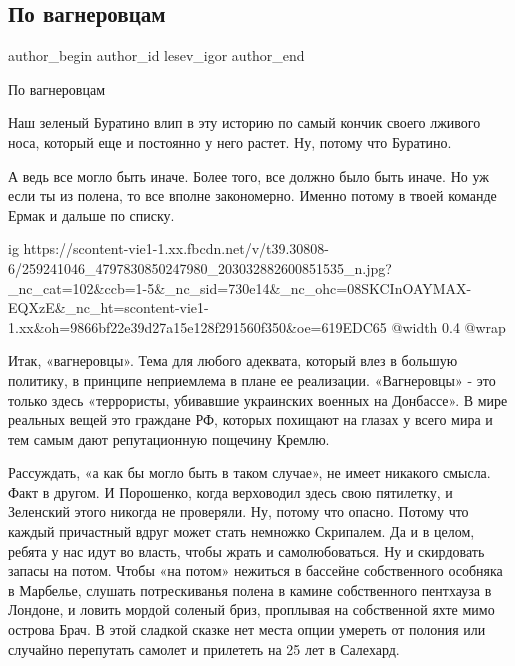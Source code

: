  
 
 
 
 
 
\subsection{По вагнеровцам}
\label{sec:20_11_2021.fb.lesev_igor.1.po_vagnerovcam}
 
\ifcmt
 author_begin
   author_id lesev_igor
 author_end
\fi

По вагнеровцам

Наш зеленый Буратино влип в эту историю по самый кончик своего лживого носа,
который еще и постоянно у него растет. Ну, потому что Буратино.

А ведь все могло быть иначе. Более того, все должно было быть иначе. Но уж если
ты из полена, то все вполне закономерно. Именно потому в твоей команде Ермак и
дальше по списку.

\ifcmt
  ig https://scontent-vie1-1.xx.fbcdn.net/v/t39.30808-6/259241046_4797830850247980_203032882600851535_n.jpg?_nc_cat=102&ccb=1-5&_nc_sid=730e14&_nc_ohc=08SKCInOAYMAX-EQXzE&_nc_ht=scontent-vie1-1.xx&oh=9866bf22e39d27a15e128f291560f350&oe=619EDC65
  @width 0.4
  @wrap 
\fi

Итак, «вагнеровцы». Тема для любого адеквата, который влез в большую политику,
в принципе неприемлема в плане ее реализации. «Вагнеровцы» - это только здесь
«террористы, убивавшие украинских военных на Донбассе». В мире реальных вещей
это граждане РФ, которых похищают на глазах у всего мира и тем самым дают
репутационную пощечину Кремлю.

Рассуждать, «а как бы могло быть в таком случае», не имеет никакого смысла.
Факт в другом. И Порошенко, когда верховодил здесь свою пятилетку, и Зеленский
этого никогда не проверяли. Ну, потому что опасно. Потому что каждый причастный
вдруг может стать немножко Скрипалем. Да и в целом, ребята у нас идут во
власть, чтобы жрать и самолюбоваться. Ну и скирдовать запасы на потом. Чтобы
«на потом» нежиться в бассейне собственного особняка в Марбелье, слушать
потрескиванья полена в камине собственного пентхауза в Лондоне, и ловить мордой
соленый бриз, проплывая на собственной яхте мимо острова Брач. В этой сладкой
сказке нет места опции умереть от полония или случайно перепутать самолет и
прилететь на 25 лет в Салехард.

